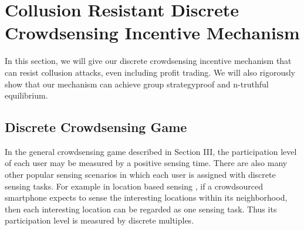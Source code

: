 \documentclass[conference]{IEEEtran}
\theoremstyle{definition}
\begin{document}
\section{Collusion Resistant Discrete Crowdsensing Incentive Mechanism}
\label{sec:discrete}

In this section, we will give our discrete crowdsensing incentive mechanism that can resist collusion attacks, even including profit trading. We will also rigorously show that our mechanism can achieve group strategyproof and n-truthful equilibrium.


\subsection{Discrete Crowdsensing Game}
In the general crowdsensing game described in Section III, %
the participation level of each user may be measured by a positive sensing time. %
There are also many other popular sensing scenarios in which each user is assigned with discrete sensing tasks. 
For example in location based sensing \cite{Alt2010Location,Liu2013A}, if a crowdsourced smartphone expects to sense the interesting locations within its neighborhood, then each interesting location can be regarded as one sensing task. Thus its participation level is measured by discrete multiples. 
\end{document}
